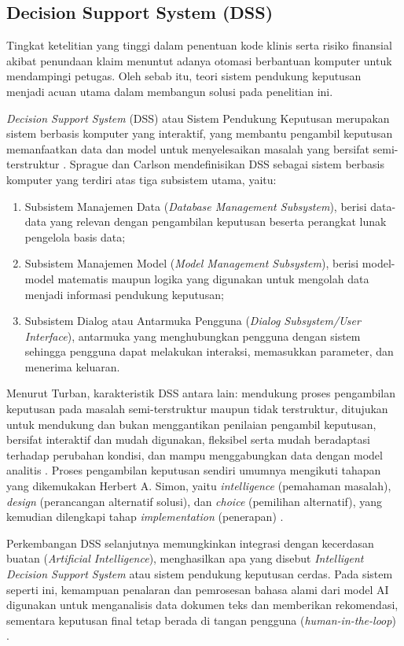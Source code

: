 \subsection{Decision Support System (DSS)}
Tingkat ketelitian yang tinggi dalam penentuan kode klinis serta risiko finansial akibat penundaan klaim menuntut adanya otomasi berbantuan komputer untuk mendampingi petugas. Oleh sebab itu, teori sistem pendukung keputusan menjadi acuan utama dalam membangun solusi pada penelitian ini.

\textit{Decision Support System} (DSS) atau Sistem Pendukung Keputusan merupakan sistem berbasis komputer yang interaktif, yang membantu pengambil keputusan memanfaatkan data dan model untuk menyelesaikan masalah yang bersifat semi-terstruktur \cite{22}. Sprague dan Carlson mendefinisikan DSS sebagai sistem berbasis komputer yang terdiri atas tiga subsistem utama, yaitu:
\begin{enumerate}
    \item Subsistem Manajemen Data (\textit{Database Management Subsystem}), berisi data-data yang relevan dengan pengambilan keputusan beserta perangkat lunak pengelola basis data;
    \item Subsistem Manajemen Model (\textit{Model Management Subsystem}), berisi model-model matematis maupun logika yang digunakan untuk mengolah data menjadi informasi pendukung keputusan;
    \item Subsistem Dialog atau Antarmuka Pengguna (\textit{Dialog Subsystem/User Interface}), antarmuka yang menghubungkan pengguna dengan sistem sehingga pengguna dapat melakukan interaksi, memasukkan parameter, dan menerima keluaran.
\end{enumerate}

Menurut Turban, karakteristik DSS antara lain: mendukung proses pengambilan keputusan pada masalah semi-terstruktur maupun tidak terstruktur, ditujukan untuk mendukung dan bukan menggantikan penilaian pengambil keputusan, bersifat interaktif dan mudah digunakan, fleksibel serta mudah beradaptasi terhadap perubahan kondisi, dan mampu menggabungkan data dengan model analitis \cite{23}. Proses pengambilan keputusan sendiri umumnya mengikuti tahapan yang dikemukakan Herbert A. Simon, yaitu \textit{intelligence} (pemahaman masalah), \textit{design} (perancangan alternatif solusi), dan \textit{choice} (pemilihan alternatif), yang kemudian dilengkapi tahap \textit{implementation} (penerapan) \cite{23}.

Perkembangan DSS selanjutnya memungkinkan integrasi dengan kecerdasan buatan (\textit{Artificial Intelligence}), menghasilkan apa yang disebut \textit{Intelligent Decision Support System} atau sistem pendukung keputusan cerdas. Pada sistem seperti ini, kemampuan penalaran dan pemrosesan bahasa alami dari model AI digunakan untuk menganalisis data dokumen teks dan memberikan rekomendasi, sementara keputusan final tetap berada di tangan pengguna (\textit{human-in-the-loop}) \cite{23}.

